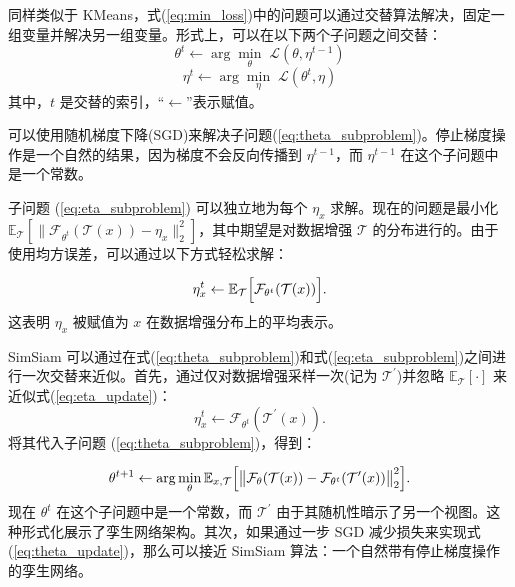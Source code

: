 \documentclass[master]{thesis-uestc}
\begin{document}
同样类似于 KMeans，式(\ref{eq:min_loss})中的问题可以通过交替算法解决，固定一组变量并解决另一组变量。形式上，可以在以下两个子问题之间交替：
\begin{equation}
\label{eq:theta_subproblem}
\theta^{t} \leftarrow \arg\min_{\theta}\;\mathcal{L}(\theta,\eta^{t-1})
\end{equation}
\begin{equation}
\label{eq:eta_subproblem}
\eta^{t} \leftarrow \arg\min_{\eta}\;\mathcal{L}(\theta^{t},\eta)
\end{equation}
其中，$t$ 是交替的索引，“$\leftarrow$”表示赋值。

可以使用随机梯度下降(SGD)来解决子问题(\ref{eq:theta_subproblem})。停止梯度操作是一个自然的结果，因为梯度不会反向传播到 $\eta^{t-1}$，而 $\eta^{t-1}$ 在这个子问题中是一个常数。

子问题 (\ref{eq:eta_subproblem}) 可以独立地为每个 $\eta_{x}$ 求解。现在的问题是最小化$\mathbb{E}_{\mathcal{T}}\left[\|\mathcal{F}_{\theta^{t}}(\mathcal{T}(x))-\eta_{x} \|_{2}^{2}\right]$，其中期望是对数据增强 $\mathcal{T}$ 的分布进行的。由于使用均方误差，可以通过以下方式轻松求解：

\begin{equation}
\label{eq:eta_update}
\eta_{x}^{t}\leftarrow\mathbb{E}_{\mathcal{T}}\Big{[}\mathcal{F}_{\theta^{t}}( \mathcal{T}(x))\Big{]}.
\end{equation}
这表明 $\eta_{x}$ 被赋值为 $x$ 在数据增强分布上的平均表示。

SimSiam 可以通过在式(\ref{eq:theta_subproblem})和式(\ref{eq:eta_subproblem})之间进行一次交替来近似。首先，通过仅对数据增强采样一次(记为 $\mathcal{T}^{\prime}$)并忽略 $\mathbb{E}_{\mathcal{T}}[\cdot]$ 来近似式(\ref{eq:eta_update})：
\begin{equation}
\label{eq:eta_approx}
\eta_{x}^{t}\leftarrow\mathcal{F}_{\theta^{t}}(\mathcal{T}^{\prime}(x)).
\end{equation}
将其代入子问题 (\ref{eq:theta_subproblem})，得到：

\begin{equation}
\label{eq:theta_update}
\theta^{t+1}\leftarrow\arg\min_{\theta}\mathbb{E}_{x,\mathcal{T}}\Big{[}\big{\| }\mathcal{F}_{\theta}(\mathcal{T}(x))-\mathcal{F}_{\theta^{t}}(\mathcal{T}^{ \prime}(x))\big{\|}_{2}^{2}\Big{]}.
\end{equation}
现在 $\theta^{t}$ 在这个子问题中是一个常数，而 $\mathcal{T}^{\prime}$ 由于其随机性暗示了另一个视图。这种形式化展示了孪生网络架构。其次，如果通过一步 SGD 减少损失来实现式(\ref{eq:theta_update})，那么可以接近 SimSiam 算法：一个自然带有停止梯度操作的孪生网络。
\end{document}
